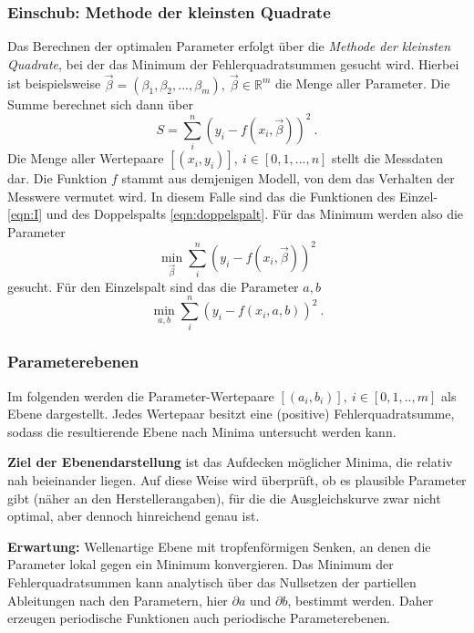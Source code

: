\subsubsection{Einschub: Methode der kleinsten Quadrate}
Das Berechnen der optimalen Parameter erfolgt über die \textit{Methode der kleinsten Quadrate}, bei der das Minimum der Fehlerquadratsummen gesucht wird.
Hierbei ist beispielsweise $\vec{\beta} = (\beta_1, \beta_2, ..., \beta_m),\:\vec{\beta}\in\mathbb{R}^m$ die Menge aller Parameter.
Die Summe berechnet sich dann über
\begin{equation}
    S = \sum_i^n (y_i - f(x_i, \vec{\beta}))^2 \:.
    \label{eqn:fehlerquadratsumme}
\end{equation}
Die Menge aller Wertepaare $[(x_i, y_i)],\: i\in[0, 1, ..., n]$ stellt die Messdaten dar. Die Funktion $f$ stammt aus demjenigen Modell, von dem das Verhalten
der Messwere vermutet wird.
In diesem Falle sind das die Funktionen des Einzel- \eqref{eqn:I} und des Doppelspalts \eqref{eqn:doppelspalt}.
Für das Minimum werden also die Parameter
\begin{equation}
    \min\limits_{\vec{\beta}} \sum_i^n (y_i - f(x_i, \vec{\beta}))^2
\end{equation}
gesucht. Für den Einzelspalt sind das die Parameter $a, b$
\begin{equation}
    \min\limits_{a, b} \sum_i^n (y_i - f(x_i, a, b))^2 \:.
\end{equation}

\subsubsection{Parameterebenen}
Im folgenden werden die Parameter-Wertepaare $[(a_i,b_i)],\:i\in[0,1,..,m]$ als Ebene dargestellt.
Jedes Wertepaar besitzt eine (positive) Fehlerquadratsumme, sodass die resultierende Ebene nach Minima untersucht werden kann.

\textbf{Ziel der Ebenendarstellung} ist das Aufdecken möglicher Minima, die relativ nah beieinander liegen.
Auf diese Weise wird überprüft, ob es plausible Parameter gibt (näher an den Herstellerangaben), für die die Ausgleichskurve zwar nicht optimal,
aber dennoch hinreichend genau ist.

\textbf{Erwartung:} Wellenartige Ebene mit tropfenförmigen Senken, an denen die Parameter lokal gegen ein Minimum konvergieren. Das Minimum der Fehlerquadratsummen kann analytisch über
das Nullsetzen der partiellen Ableitungen nach den Parametern, hier $\partial a$ und $\partial b$, bestimmt werden.
Daher erzeugen periodische Funktionen auch periodische Parameterebenen.

